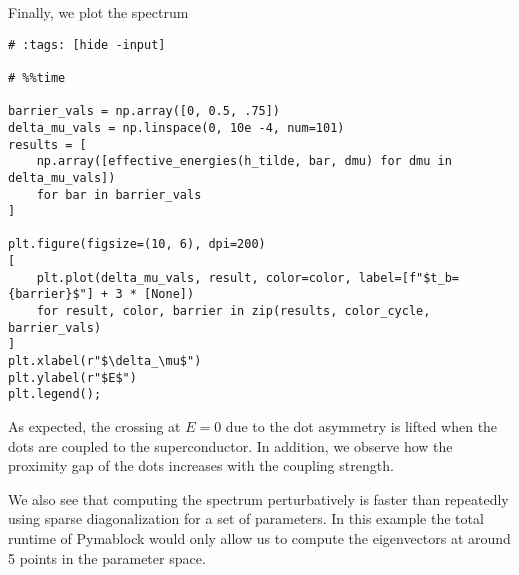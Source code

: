 Finally, we plot the spectrum

\begin{verbatim}
# :tags: [hide -input]

# %%time

barrier_vals = np.array([0, 0.5, .75])
delta_mu_vals = np.linspace(0, 10e -4, num=101)
results = [
    np.array([effective_energies(h_tilde, bar, dmu) for dmu in delta_mu_vals])
    for bar in barrier_vals
]

plt.figure(figsize=(10, 6), dpi=200)
[
    plt.plot(delta_mu_vals, result, color=color, label=[f"$t_b={barrier}$"] + 3 * [None])
    for result, color, barrier in zip(results, color_cycle, barrier_vals)
]
plt.xlabel(r"$\delta_\mu$")
plt.ylabel(r"$E$")
plt.legend();
\end{verbatim}


As expected, the crossing at $E=0$ due to the dot asymmetry is lifted when the
dots are coupled to the superconductor. In addition, we observe how the
proximity gap of the dots increases with the coupling strength.

We also see that computing the spectrum perturbatively is faster than
repeatedly using sparse diagonalization for a set of parameters.
In this example the total runtime of Pymablock would only allow us to compute
the  eigenvectors at around 5 points in the parameter space.
